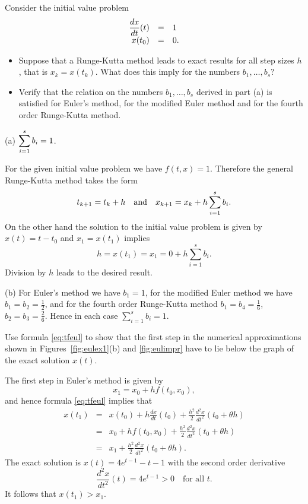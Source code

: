\documentclass{ximera}
\begin{document}
\begin{exercise} \label{c15.1.4}
Consider the initial value problem
\[
\begin{array}{rcl}
\displaystyle\frac{dx}{dt}(t) & = & 1 \\
x(t_0) & = & 0.
\end{array}
\]
\begin{itemize}
\item[(a)] Suppose that a Runge-Kutta method leads to exact
results for all step sizes $h$, that is $x_k=x(t_k)$.  What 
does this imply for the numbers $b_1,\ldots,b_s$?
\item[(b)] Verify that the relation on the numbers $b_1,\ldots,b_s$
derived in part (a) is satisfied
for Euler's method, for the modified Euler method and for the
fourth order Runge-Kutta method.
\end{itemize}

\begin{solution}

(a) \ans $\displaystyle\sum_{i=1}^s b_i = 1$.

\soln For the given initial value problem we have $f(t,x)=1$.
Therefore the general Runge-Kutta method takes the form
\[
t_{k+1} = t_k + h\quad\mbox{and}\quad x_{k+1} = x_k + h\sum_{i=1}^s b_i.
\]
On the other hand the solution to the initial value problem is
given by $x(t) = t-t_0$ and $x_1=x(t_1)$ implies
\[
h = x(t_1) = x_1 = 0+h\sum_{i=1}^s b_i.
\]
Division by $h$ leads to the desired result.

(b) For Euler's method we have $b_1=1$, for the modified Euler
method we have $b_1=b_2=\frac{1}{2}$, and for the fourth order
Runge-Kutta method $b_1=b_4 = \frac{1}{6}$,
$b_2 = b_3 = \frac{2}{6}$.  Hence in each case $\sum_{i=1}^s b_i=1$.

\end{solution}
\end{exercise}

\begin{exercise} \label{c15.1.4a}
Use formula \eqref{eq:tfeul} to show that the first step in
the numerical approximations shown in Figures~\ref{fig:eulex1}(b)
and \ref{fig:eulimpr} have to lie below the graph of
the exact solution $x(t)$.

\begin{solution}
The first step in Euler's method is given by
\[
x_1 = x_0 + hf(t_0,x_0),
\]
and hence formula \eqref{eq:tfeul} implies that
\begin{eqnarray*}
x(t_1) &=&  x(t_0)+h\frac{dx}{dt}(t_0)+
\frac{h^2}{2}\frac{d^2x}{dt^2}(t_0+\theta h)\\
&=& x_0 + hf(t_0,x_0) +\frac{h^2}{2}\frac{d^2x}{dt^2}(t_0+\theta h)\\
&=& x_1 +\frac{h^2}{2}\frac{d^2x}{dt^2}(t_0+\theta h).
\end{eqnarray*}
The exact solution is $x(t)= 4e^{t-1}-t-1$ with the second order
derivative
\[
\frac{d^2x}{dt^2}(t) = 4e^{t-1}>0\quad \mbox{for all $t$.}
\]
It follows that $x(t_1) > x_1$.

\end{solution}
\end{exercise}
\end{document}
